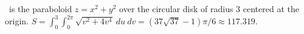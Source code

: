 {\surfaceS\ is the paraboloid $z=x^2+y^2$ over the circular disk of radius 3 centered at the origin.
}
{$S =\int_0^3\int_0^{2\pi}\sqrt{v^2+4v^4}\ du\ dv= (37\sqrt{37}-1)\pi/6 \approx 117.319$.
}
